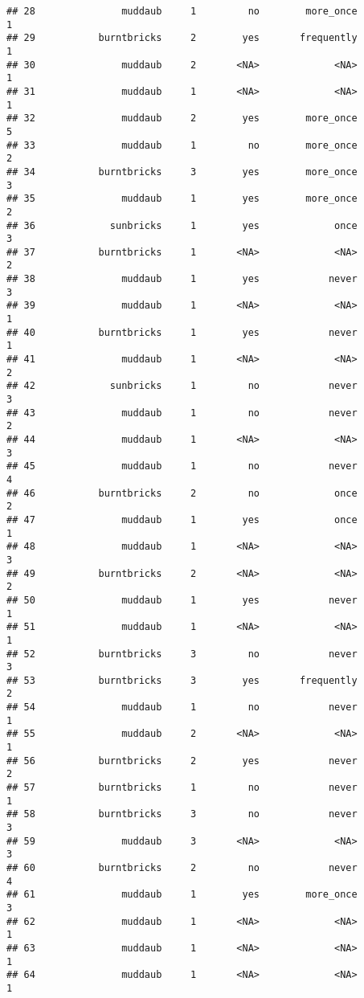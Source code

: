 \documentclass[
]{article}
\begin{document}
\begin{verbatim}
## 28               muddaub     1         no        more_once         1
## 29           burntbricks     2        yes       frequently         1
## 30               muddaub     2       <NA>             <NA>         1
## 31               muddaub     1       <NA>             <NA>         1
## 32               muddaub     2        yes        more_once         5
## 33               muddaub     1         no        more_once         2
## 34           burntbricks     3        yes        more_once         3
## 35               muddaub     1        yes        more_once         2
## 36             sunbricks     1        yes             once         3
## 37           burntbricks     1       <NA>             <NA>         2
## 38               muddaub     1        yes            never         3
## 39               muddaub     1       <NA>             <NA>         1
## 40           burntbricks     1        yes            never         1
## 41               muddaub     1       <NA>             <NA>         2
## 42             sunbricks     1         no            never         3
## 43               muddaub     1         no            never         2
## 44               muddaub     1       <NA>             <NA>         3
## 45               muddaub     1         no            never         4
## 46           burntbricks     2         no             once         2
## 47               muddaub     1        yes             once         1
## 48               muddaub     1       <NA>             <NA>         3
## 49           burntbricks     2       <NA>             <NA>         2
## 50               muddaub     1        yes            never         1
## 51               muddaub     1       <NA>             <NA>         1
## 52           burntbricks     3         no            never         3
## 53           burntbricks     3        yes       frequently         2
## 54               muddaub     1         no            never         1
## 55               muddaub     2       <NA>             <NA>         1
## 56           burntbricks     2        yes            never         2
## 57           burntbricks     1         no            never         1
## 58           burntbricks     3         no            never         3
## 59               muddaub     3       <NA>             <NA>         3
## 60           burntbricks     2         no            never         4
## 61               muddaub     1        yes        more_once         3
## 62               muddaub     1       <NA>             <NA>         1
## 63               muddaub     1       <NA>             <NA>         1
## 64               muddaub     1       <NA>             <NA>         1

\end{verbatim}
\end{document}
